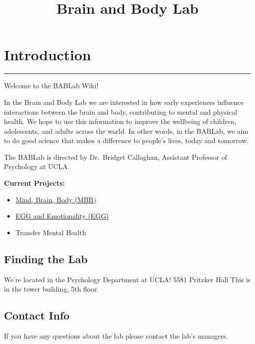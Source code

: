 \documentclass[]{book}
\title{Brain and Body Lab}
\author{}
\date{}
\providecommand{\tightlist}{%
  \setlength{\itemsep}{0pt}\setlength{\parskip}{0pt}}
\begin{document}
\maketitle

{
\setcounter{tocdepth}{1}
\tableofcontents
}
\hypertarget{introduction}{%
\chapter{Introduction}\label{introduction}}

\begin{center}\rule{0.5\linewidth}{\linethickness}\end{center}

Welcome to the BABLab Wiki!

In the Brain and Body Lab we are interested in how early experiences influence interactions between the brain and body, contributing to mental and physical health. We hope to use this information to improve the wellbeing of children, adolescents, and adults across the world. In other words, in the BABLab, we aim to do good science that makes a difference to people's lives, today and tomorrow.

The BABLab is directed by Dr.~Bridget Callaghan, Assistant Professor of Psychology at UCLA.

\textbf{Current Projects:}

\begin{itemize}
\tightlist
\item
  \href{https://osf.io/ha3rq/}{Mind, Brain, Body (MBB)}
\item
  \href{https://osf.io/nf2bv/}{EGG and Emotionality (EGG)}
\item
  Transfer Mental Health
\end{itemize}

\hypertarget{finding-the-lab}{%
\section{Finding the Lab}\label{finding-the-lab}}

We're located in the Psychology Department at UCLA!
5581 Pritzker Hall
This is in the tower building, 5th floor.

\hypertarget{contact-info}{%
\section{Contact Info}\label{contact-info}}

If you have any questions about the lab please contact the lab's managers.
\end{document}
